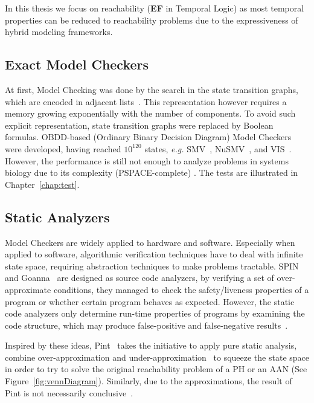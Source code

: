 In this thesis we focus on reachability (\textbf{EF} in Temporal Logic) as most temporal properties can be reduced to reachability problems due to the expressiveness of hybrid modeling frameworks.

\subsection{Exact Model Checkers}
At first, Model Checking was done by the search in the state transition graphs, which are encoded in adjacent lists~\cite{clarke1981design}.
This representation however requires a memory growing exponentially with the number of components.
To avoid such explicit representation, state transition graphs were replaced by Boolean formulas.
OBDD-based (Ordinary Binary Decision Diagram) Model Checkers were developed, having reached $10^{120}$ states, \textit{e.g.}
SMV~\cite{mcmillan1993symbolic}, NuSMV~\cite{cimatti2000nusmv}, and VIS~\cite{brayton1996vis}.
However, the performance is still not enough to analyze problems in systems biology due to its complexity (PSPACE-complete) \cite{harel2002complexity}.
The tests are illustrated in Chapter~\ref{chap:test}.  

\subsection{Static Analyzers}
Model Checkers are widely applied to hardware and software.
Especially when applied to software, algorithmic verification techniques have
to deal with  infinite state space, requiring abstraction techniques to make problems tractable.
SPIN~\cite{holzmann1997model} and Goanna~\cite{fehnker2006goanna} are designed as source code analyzers, by verifying a set of over-approximate conditions, they managed to check the safety/liveness properties of a program or whether certain program behaves as expected. 
However, the static code analyzers only determine run-time properties of programs by examining the code structure, which may produce false-positive and false-negative results~\cite{vorobyov2010comparing}.

Inspired by these ideas, Pint~\cite{Pint} takes the initiative to apply pure static analysis, combine over-approximation and under-approximation~\cite{pauleve2012} to squeeze the state space in order to try to solve the original reachability problem of a PH or an AAN (See Figure~\ref{fig:vennDiagram}).
Similarly, due to the approximations, the result of Pint is not necessarily conclusive~\cite{folschette2015}.

